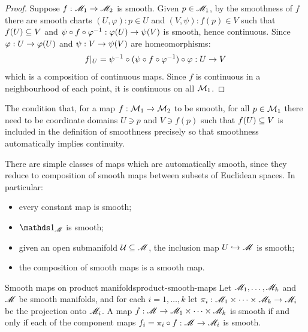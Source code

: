 \begin{proofbox}
  \begin{proof}
    Suppose $ f : \mathscr{M}_1 \rightarrow \mathscr{M}_2 $ is smooth. Given $ p \in \mathscr{M}_1 $, by the smoothness of $ f $ there are smooth charts $ (U,\varphi) : p \in U $ and $ (V,\psi) : f(p) \in V $ such that $ f(U) \subseteq V $ and $ \psi \circ f \circ \varphi^{-1} : \varphi(U) \rightarrow \psi(V) $ is smooth, hence continuous. Since $ \varphi : U \rightarrow \varphi(U) $ and $ \psi : V \rightarrow \psi(V) $ are homeomorphisms:
    \begin{equation*}
      f \vert_U = \psi^{-1} \circ (\psi \circ f \circ \varphi^{-1}) \circ \varphi : U \rightarrow V
    \end{equation*}
    which is a composition of continuous maps. Since $ f $ is continuous in a neighbourhood of each point, it is continuous on all $ \mathcal{M}_1 $.
  \end{proof}
\end{proofbox}

The condition that, for a map $ f : \mathcal{M}_1 \rightarrow \mathcal{M}_2 $ to be smooth, for all $ p \in \mathcal{M}_1 $ there need to be coordinate domains $ U \ni p $ and $ V \ni f(p) $ such that $ f(U) \subseteq V $ is included in the definition of smoothness precisely so that smoothness automatically implies continuity.

There are simple classes of maps which are automatically smooth, since they reduce to composition of smooth maps between subsets of Euclidean spaces. In particular:
\begin{itemize}
  \item every constant map is smooth;
  \item $ \id_\man $ is smooth;
  \item given an open submanifold $ \mathcal{U} \subseteq \mathscr{M} $, the inclusion map $ U \hookrightarrow \mathscr{M} $ is smooth;
  \item the composition of smooth maps is a smooth map.
\end{itemize}

\begin{proposition}{Smooth maps on product manifolds}{product-smooth-maps}
  Let $ \mathscr{M}_1 , \dots , \mathscr{M}_k $ and $ \mathscr{M} $ be smooth manifolds, and for each $ i = 1 , \dots , k $ let $ \pi_i : \mathscr{M}_1 \times \dots \times \mathscr{M}_k \rightarrow \mathscr{M}_i $ be the projection onto $ \mathscr{M}_i $. A map $ f : \mathscr{M} \rightarrow \mathscr{M}_1 \times \dots \times \mathscr{M}_k $ is smooth if and only if each of the component maps $ f_i = \pi_i \circ f : \mathscr{M} \rightarrow \mathscr{M}_i $ is smooth.
\end{proposition}

